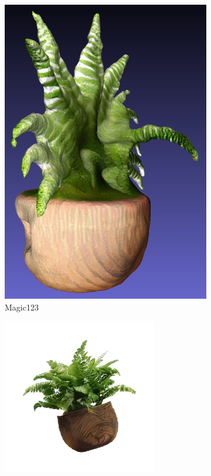 \begin{figure}[ht]
\begin{subfigure}[b]{0.2\textwidth}
        \includegraphics[width=\textwidth]{figures/subjective/magic123_fern_side_result.png}
        \caption{Magic123}
    \end{subfigure}
    \begin{subfigure}[b]{0.32\textwidth}
        \centering
        \includegraphics[width=\textwidth]{figures/subjective/rgb_000_right.png}

\end{subfigure}
\end{figure}
